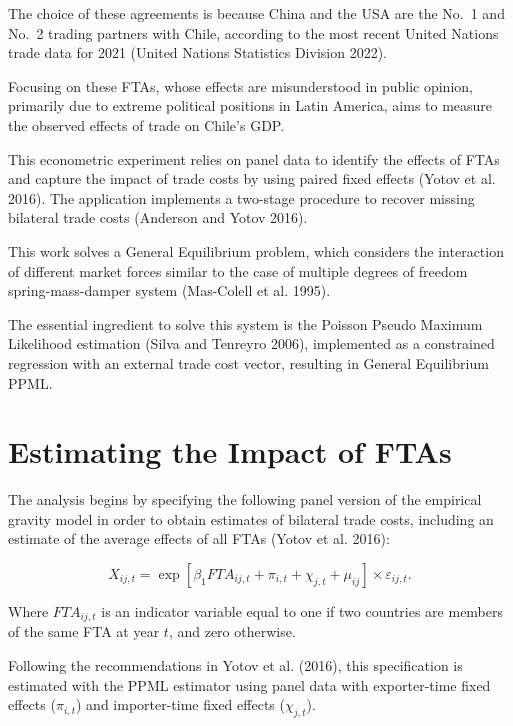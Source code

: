 \documentclass[10pt]{article}
\begin{document}
The choice of these agreements is because China and the USA are the
No.~1 and No.~2 trading partners with Chile, according to the most
recent United Nations trade data for 2021 (United Nations Statistics
Division 2022).

Focusing on these FTAs, whose effects are misunderstood in public
opinion, primarily due to extreme political positions in Latin America,
aims to measure the observed effects of trade on Chile's GDP.

This econometric experiment relies on panel data to identify the effects
of FTAs and capture the impact of trade costs by using paired fixed
effects (Yotov et al. 2016). The application implements a two-stage
procedure to recover missing bilateral trade costs (Anderson and Yotov
2016).

This work solves a General Equilibrium problem, which considers the
interaction of different market forces similar to the case of multiple
degrees of freedom spring-mass-damper system (Mas-Colell et al. 1995).

The essential ingredient to solve this system is the Poisson Pseudo
Maximum Likelihood estimation (Silva and Tenreyro 2006), implemented as
a constrained regression with an external trade cost vector, resulting
in General Equilibrium PPML.

\hypertarget{estimating-the-impact-of-ftas}{%
\section{Estimating the Impact of
FTAs}\label{estimating-the-impact-of-ftas}}

The analysis begins by specifying the following panel version of the
empirical gravity model in order to obtain estimates of bilateral trade
costs, including an estimate of the average effects of all FTAs (Yotov
et al. 2016):

\begin{equation}
X_{ij,t} = \exp\left[\beta_1 FTA_{ij,t} + \pi_{i,t} + \chi_{j,t} + \mu_{ij}\right] \times \varepsilon_{ij,t}.\label{eq:1}
\end{equation}

Where \(FTA_{ij,t}\) is an indicator variable equal to one if two
countries are members of the same FTA at year \(t\), and zero otherwise.

Following the recommendations in Yotov et al. (2016), this specification
is estimated with the PPML estimator using panel data with exporter-time
fixed effects (\(\pi_{i,t}\)) and importer-time fixed effects
(\(\chi_{j,t}\)).
\end{document}
